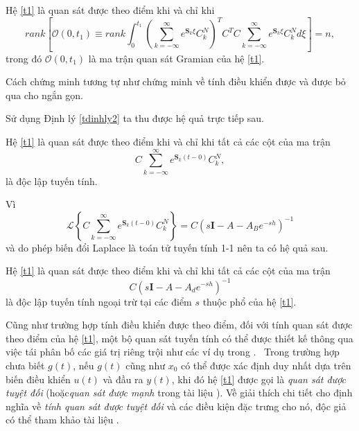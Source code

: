 \begin{dly}\label{tdinhly2}     	  
	Hệ \eqref{t1} là quan sát được theo điểm khi và chỉ khi
	\begin{equation}\label{t16}
	rank\left[\mathcal{O}(0,t_1)\equiv rank\int^{t_1}_0\left(\sum\limits^\infty_{k=-\infty}e^{\mathbf{S}_k \xi }C^N_k\right)^TC^TC\sum\limits^\infty_{k=-\infty}e^{\mathbf{S}_k \xi} C^N_kd\xi \right]=n,
	\end{equation}
	trong đó $\mathcal{O}(0,t_1)$ là ma trận quan sát Gramian của hệ \eqref{t1}. 
\end{dly}
%
\begin{cm}
Cách chứng minh tương tự như chứng minh về tính điều khiển được và được bỏ qua cho ngắn gọn.
\end{cm}
%
\noindent Sử dụng Định lý \ref{tdinhly2} ta thu được hệ quả trực tiếp sau.

\begin{hqua}\label{coro 3}
	Hệ \eqref{t1} là quan sát được theo điểm khi và chỉ khi tất cả các cột của ma trận
	\begin{equation}\label{t17}
	C\sum\limits^\infty_{k=-\infty}e^{\mathbf{S}_k(t-0)}C^N_k,
	\end{equation}	
	là độc lập tuyến tính.	
\end{hqua}
%	       
Vì
%
\begin{equation}
\mathcal{L} \left\{ C \sum\limits^\infty_{k=-\infty} e^{\mathbf{S}_k(t-0)}C^N_k \right\} = C (s\mathbf{I}-A-A_{B}e^{-sh})^{-1}
\end{equation}
%
và do phép biến đổi Laplace là toán tử tuyến tính 1-1 nên ta có hệ quả sau.
%
\begin{hqua}\label{coro 4}
	Hệ \eqref{t1} là quan sát được theo điểm khi và chỉ khi tất cả các cột của ma trận
	\begin{equation}\label{t18}
	C(s\mathbf{I}-A-A_de^{-sh})^{-1}
	\end{equation}
	là độc lập tuyến tính ngoại trừ tại các điểm $s$ thuộc phổ của hệ \eqref{t1}.
\end{hqua}

\begin{gch} Cũng như trường hợp tính điều khiển được theo điểm, đối với tính quan sát được theo điểm của hệ \eqref{t1}, một bộ quan sát tuyến tính có thể được thiết kế thông qua việc tái phân bố các giá trị riêng trội như các ví dụ trong \cite{YiNU07}. \ Trong trường hợp chưa biết $g(t)$, nếu $g(t)$ cũng như $x_0$ có thể được xác định duy nhất dựa trên biến điều khiển $u(t)$ và đầu ra $y(t)$, khi đó hệ \eqref{t1} được gọi là \textit{quan sát được tuyệt đối} (hoặc\textit{quan sát được mạnh} trong tài liệu \cite{Del72}). Về giải thích chi tiết cho định nghĩa về \textit{tính quan sát được tuyệt đối} và các điều kiện đặc trưng cho nó, độc giả có thể tham khảo tài liệu \cite{Del72}. 
\end{gch}


